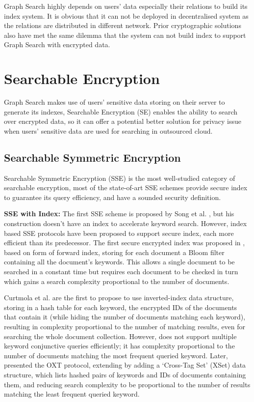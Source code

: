 Graph Search highly depends on users' data especially their relations to build its index system. It is obvious that it can not be deployed in decentralised system as the relations are distributed in different network. Prior cryptographic solutions also have met the same dilemma that the system can not build index to support Graph Search with encrypted data. 

\section{Searchable Encryption}
Graph Search makes use of users' sensitive data storing on their server to generate its indexes, Searchable Encryption (SE) enables the ability to search over encrypted data, so it can offer a potential better solution for privacy issue when users' sensitive data are used for searching in outsourced cloud.

\subsection{Searchable Symmetric Encryption}
Searchable Symmetric Encryption (SSE) is  the most well-studied category of searchable encryption, most of the state-of-art SSE schemes provide secure index to guarantee its query efficiency, and have a sounded security definition.

{\bf SSE with Index:} The first SSE scheme is proposed by Song et al. \cite{song2000practical}, but his construction doesn't have an index to accelerate keyword search. However, index based SSE protocols have been proposed to support secure index, each more efficient than its predecessor. 
The first secure encrypted index was proposed in \cite{goh2003secure}, based on form of forward index, storing for each document a Bloom filter containing all the document's keywords. This allows a single document to be searched in a constant time but requires each document to be checked in turn which gains a search complexity proportional to the number of documents.

Curtmola et al. \cite{curtmola2011searchable} are the first to propose to use inverted-index data structure, storing in a hash table for each keyword, the encrypted IDs of the documents that contain it (while hiding the number of documents matching each keyword), resulting in complexity proportional to the number of matching results, even for searching the whole document collection. However, \cite{curtmola2011searchable} does not support multiple keyword conjunctive queries efficiently; it has complexity proportional to the number of documents matching the most frequent queried keyword. 
Later, \cite{cash2013highly} presented the OXT protocol, extending \cite{curtmola2011searchable} by adding a `Cross-Tag Set' (XSet) data structure, which lists hashed pairs of keywords and IDs of documents containing them, and reducing search complexity to be proportional to the number of results matching the least frequent queried keyword.

